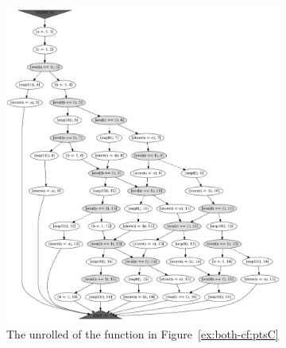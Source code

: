 \begin{figure}%
%
\begin{subfigure}[b]{.6\textwidth}\centering
  \includegraphics[height=.65\textheight,width=1.1\textwidth]{img/my/graphs/unrolling-comparison/PorthosC/t0_unrolled.png}
  \hfill
  \caption{The unrolled \xgraph{} of the function in Figure~\ref{ex:both-cf:ptsC}}
  \label{ex:both-cf:graphU:ptsC}
\end{subfigure}
\hfill
%
\begin{subfigure}[b]{.3\textwidth}\centering

\end{subfigure}
\end{figure}
